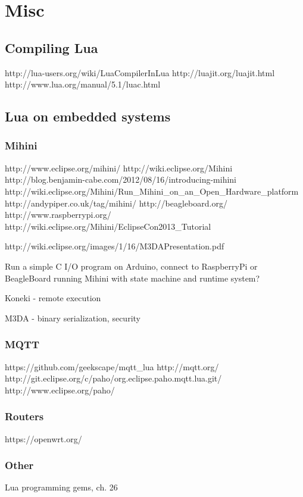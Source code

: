 \chapter{Misc}

\section{Compiling Lua}
\label{sec:compiling}

http://lua-users.org/wiki/LuaCompilerInLua
http://luajit.org/luajit.html
http://www.lua.org/manual/5.1/luac.html


\section{Lua on embedded systems}

\subsection{Mihini}

http://www.eclipse.org/mihini/
http://wiki.eclipse.org/Mihini
http://blog.benjamin-cabe.com/2012/08/16/introducing-mihini
http://wiki.eclipse.org/Mihini/Run_Mihini_on_an_Open_Hardware_platform
http://andypiper.co.uk/tag/mihini/
http://beagleboard.org/
http://www.raspberrypi.org/
http://wiki.eclipse.org/Mihini/EclipseCon2013_Tutorial

http://wiki.eclipse.org/images/1/16/M3DAPresentation.pdf

Run a simple C I/O program on Arduino, connect to RaspberryPi or BeagleBoard running Mihini with state machine and runtime system?

Koneki - remote execution

M3DA - binary serialization, security

\subsection{MQTT}
https://github.com/geekscape/mqtt_lua
http://mqtt.org/
http://git.eclipse.org/c/paho/org.eclipse.paho.mqtt.lua.git/
http://www.eclipse.org/paho/


\subsection{Routers}
https://openwrt.org/

\subsection{Other}
Lua programming gems, ch. 26